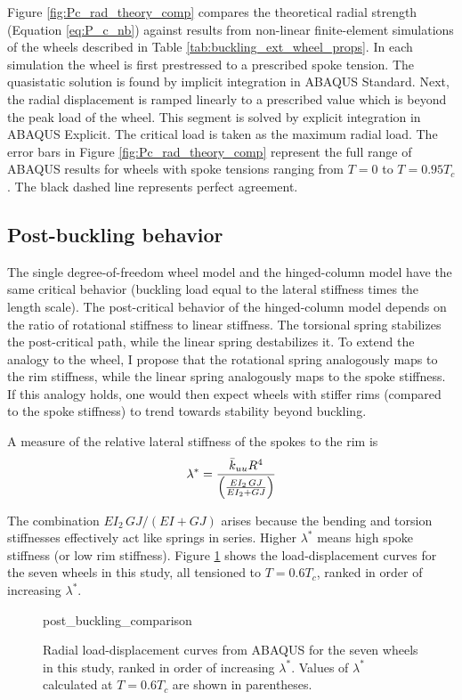 \documentclass[\rootdir/thesis.tex]{subfiles}
\begin{document}
Figure \ref{fig:Pc_rad_theory_comp} compares the theoretical radial strength (Equation \eqref{eq:P_c_nb}) against results from non-linear finite-element simulations of the wheels described in Table \ref{tab:buckling_ext_wheel_props}. In each simulation the wheel is first prestressed to a prescribed spoke tension. The quasistatic solution is found by implicit integration in ABAQUS Standard. Next, the radial displacement is ramped linearly to a prescribed value which is beyond the peak load of the wheel. This segment is solved by explicit integration in ABAQUS Explicit. The critical load is taken as the maximum radial load. The error bars in Figure \ref{fig:Pc_rad_theory_comp} represent the full range of ABAQUS results for wheels with spoke tensions ranging from $T=0$ to $T=0.95T_c$. The black dashed line represents perfect agreement.

\subsection{Post-buckling behavior}

The single degree-of-freedom wheel model and the hinged-column model have the same critical behavior (buckling load equal to the lateral stiffness times the length scale). The post-critical behavior of the hinged-column model depends on the ratio of rotational stiffness to linear stiffness. The torsional spring stabilizes the post-critical path, while the linear spring destabilizes it. To extend the analogy to the wheel, I propose that the rotational spring analogously maps to the rim stiffness, while the linear spring analogously maps to the spoke stiffness. If this analogy holds, one would then expect wheels with stiffer rims (compared to the spoke stiffness) to trend towards stability beyond buckling.

A measure of the relative lateral stiffness of the spokes to the rim is
\begin{equation}
\lambda^* = \frac{\bar{k}_{uu} R^4}{\left(\frac{EI_2\,GJ}{EI_2+GJ}\right)}
\end{equation}

The combination $EI_2\,GJ/(EI+GJ)$ arises because the bending and torsion stiffnesses effectively act like springs in series. Higher $\lambda^*$ means high spoke stiffness (or low rim stiffness). Figure \ref{fig:post_buckling_comparison} shows the load-displacement curves for the seven wheels in this study, all tensioned to $T=0.6T_c$, ranked in order of increasing $\lambda^*$.

\begin{figure}[h]
\centering
{post_buckling_comparison}
\caption{Radial load-displacement curves from ABAQUS for the seven wheels in this study, ranked in order of increasing $\lambda^*$. Values of $\lambda^*$ calculated at $T=0.6T_c$ are shown in parentheses.}
\label{fig:post_buckling_comparison}
\end{figure}
\end{document}
